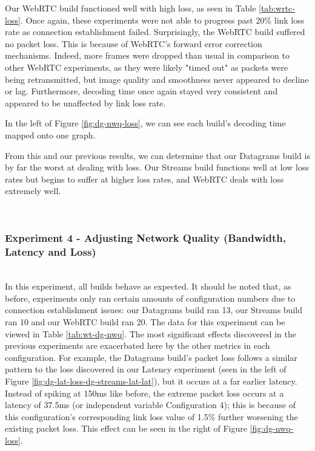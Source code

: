 Our WebRTC build functioned well with high loss, as seen in Table \ref{tab:wrtc-loss}. Once again, these experiments were not able to progress past 20\% link loss rate as connection establishment failed. 
Surprisingly, the WebRTC build suffered no packet loss. This is because of WebRTC's forward error correction mechanisms. Indeed, more frames were dropped than usual in comparison to other WebRTC experiments, as they were likely "timed out" as packets were being retransmitted, but image quality and smoothness never appeared to decline or lag. Furthermore, decoding time once again stayed very consistent and appeared to be unaffected by link loss rate.

In the left of Figure \ref{fig:dg-nwq-loss}, we can see each build's decoding time mapped onto one graph.


From this and our previous results, we can determine that our Datagrams build is by far the worst at dealing with loss. Our Streams build functions well at low loss rates but begins to suffer at higher loss rates, and WebRTC deals with loss extremely well.

\hfill{} \\
\subsubsection{Experiment 4 - Adjusting Network Quality (Bandwidth, Latency and Loss)} 
\hfill{} \\
In this experiment, all builds behave as expected. It should be noted that, as before, experiments only ran certain amounts of configuration numbers due to connection establishment issues: our Datagrams build ran 13, our Streams build ran 10 and our WebRTC build ran 20. The data for this experiment can be viewed in Table \ref{tab:wt-dg-nwq}. The most significant effects discovered in the previous experiments are exacerbated here by the other metrics in each configuration. For example, the Datagrams build's packet loss follows a similar pattern to the loss discovered in our Latency experiment (seen in the left of Figure \ref{fig:dg-lat-loss-dg-streams-lat-lat}), but it occurs at a far earlier latency. Instead of spiking at 150ms like before, the extreme packet loss occurs at a latency of 37.5ms (or independent variable Configuration 4); this is because of this configuration's corresponding link loss value of 1.5\% further worsening the existing packet loss. This effect can be seen in the right of Figure \ref{fig:dg-nwq-loss}.

